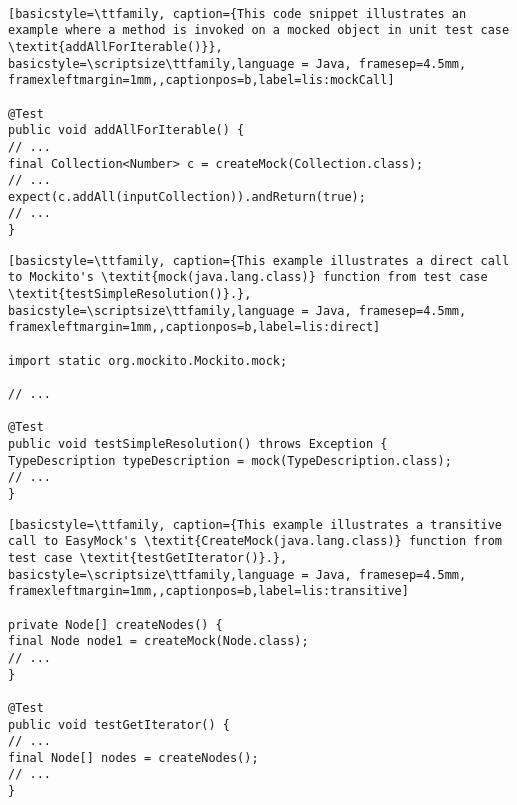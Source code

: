 ‎

\begin{lstlisting}[basicstyle=\ttfamily, caption={This code snippet illustrates an example where a method is invoked on a mocked object in unit test case \textit{addAllForIterable()}},
basicstyle=\scriptsize\ttfamily,language = Java, framesep=4.5mm,
framexleftmargin=1mm,,captionpos=b,label=lis:mockCall]

@Test
public void addAllForIterable() {
// ...
final Collection<Number> c = createMock(Collection.class);
// ...
expect(c.addAll(inputCollection)).andReturn(true);
// ...
}

\end{lstlisting}

\begin{lstlisting}[basicstyle=\ttfamily, caption={This example illustrates a direct call to Mockito's \textit{mock(java.lang.class)} function from test case \textit{testSimpleResolution()}.},
basicstyle=\scriptsize\ttfamily,language = Java, framesep=4.5mm,
framexleftmargin=1mm,,captionpos=b,label=lis:direct]

import static org.mockito.Mockito.mock;

// ...

@Test
public void testSimpleResolution() throws Exception {
TypeDescription typeDescription = mock(TypeDescription.class);
// ...
}

\end{lstlisting}

\begin{lstlisting}[basicstyle=\ttfamily, caption={This example illustrates a transitive call to EasyMock's \textit{CreateMock(java.lang.class)} function from test case \textit{testGetIterator()}.},
basicstyle=\scriptsize\ttfamily,language = Java, framesep=4.5mm,
framexleftmargin=1mm,,captionpos=b,label=lis:transitive]

private Node[] createNodes() {
final Node node1 = createMock(Node.class);
// ...
}

@Test
public void testGetIterator() {
// ...
final Node[] nodes = createNodes();
// ...
}

\end{lstlisting}
